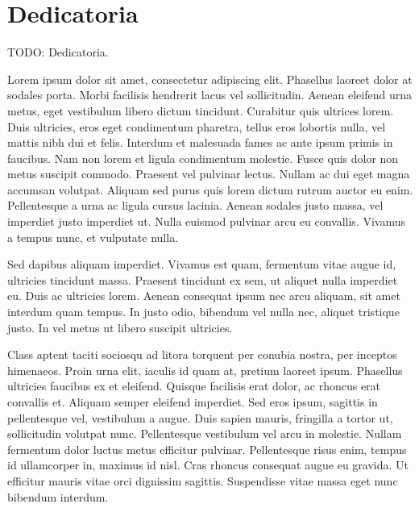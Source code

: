 \chapter*{Dedicatoria}

TODO: Dedicatoria.

Lorem ipsum dolor sit amet, consectetur adipiscing elit. Phasellus laoreet dolor at sodales porta. Morbi facilisis hendrerit lacus vel sollicitudin. Aenean eleifend urna metus, eget vestibulum libero dictum tincidunt. Curabitur quis ultrices lorem. Duis ultricies, eros eget condimentum pharetra, tellus eros lobortis nulla, vel mattis nibh dui et felis. Interdum et malesuada fames ac ante ipsum primis in faucibus. Nam non lorem et ligula condimentum molestie. Fusce quis dolor non metus suscipit commodo. Praesent vel pulvinar lectus. Nullam ac dui eget magna accumsan volutpat. Aliquam sed purus quis lorem dictum rutrum auctor eu enim. Pellentesque a urna ac ligula cursus lacinia. Aenean sodales justo massa, vel imperdiet justo imperdiet ut. Nulla euismod pulvinar arcu eu convallis. Vivamus a tempus nunc, et vulputate nulla.

Sed dapibus aliquam imperdiet. Vivamus est quam, fermentum vitae augue id, ultricies tincidunt massa. Praesent tincidunt ex sem, ut aliquet nulla imperdiet eu. Duis ac ultricies lorem. Aenean consequat ipsum nec arcu aliquam, sit amet interdum quam tempus. In justo odio, bibendum vel nulla nec, aliquet tristique justo. In vel metus ut libero suscipit ultricies.

Class aptent taciti sociosqu ad litora torquent per conubia nostra, per inceptos himenaeos. Proin urna elit, iaculis id quam at, pretium laoreet ipsum. Phasellus ultricies faucibus ex et eleifend. Quisque facilisis erat dolor, ac rhoncus erat convallis et. Aliquam semper eleifend imperdiet. Sed eros ipsum, sagittis in pellentesque vel, vestibulum a augue. Duis sapien mauris, fringilla a tortor ut, sollicitudin volutpat nunc. Pellentesque vestibulum vel arcu in molestie. Nullam fermentum dolor luctus metus efficitur pulvinar. Pellentesque risus enim, tempus id ullamcorper in, maximus id nisl. Cras rhoncus consequat augue eu gravida. Ut efficitur mauris vitae orci dignissim sagittis. Suspendisse vitae massa eget nunc bibendum interdum.
